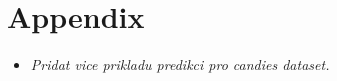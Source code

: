\chapter*{Appendix}
\begin{itemize}
  \item \textit{Pridat vice prikladu predikci pro candies dataset.}
\end{itemize}